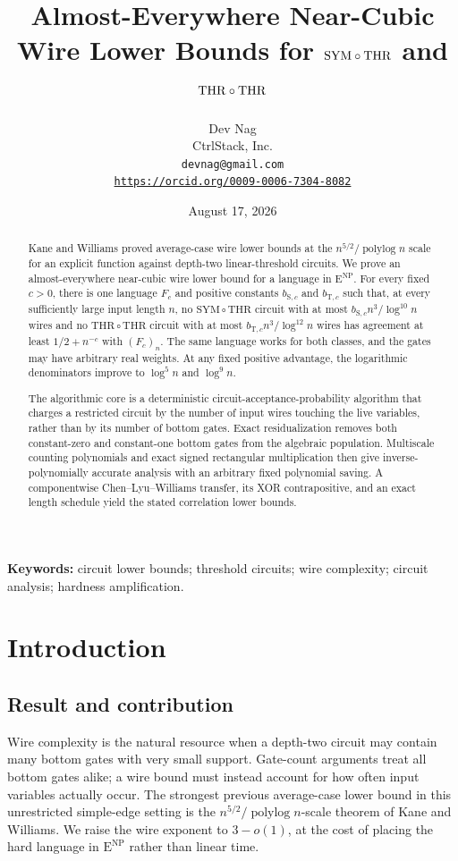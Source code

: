\documentclass[11pt,letterpaper]{article}
\title{Almost-Everywhere Near-Cubic Wire Lower Bounds for
\(\SYMTHR\) and \(\THRTHR\)}
\author{Dev Nag\\
CtrlStack, Inc.\\
\texttt{devnag@gmail.com}\\
\href{https://orcid.org/0009-0006-7304-8082}{\nolinkurl{https://orcid.org/0009-0006-7304-8082}}}
\date{August 17, 2026}
\theoremstyle{definition}
\theoremstyle{remark}
\newcommand{\polylog}{\operatorname{polylog}}
\newcommand{\Eclass}{\mathrm E^{\mathrm{NP}}}
\newcommand{\SYMTHR}{\mathrm{SYM}\circ\mathrm{THR}}
\newcommand{\THRTHR}{\mathrm{THR}\circ\mathrm{THR}}
\begin{document}
\maketitle
\begin{abstract}
Kane and Williams proved average-case wire lower bounds at the
\(n^{5/2}/\polylog n\) scale for an explicit function against depth-two
linear-threshold circuits. We prove an almost-everywhere near-cubic wire
lower bound for a language in \(\Eclass\). For every fixed \(c>0\), there is
one language \(F_c\) and positive constants \(b_{\mathrm S,c}\) and
\(b_{\mathrm T,c}\) such that, at every sufficiently large input length
\(n\), no \(\SYMTHR\) circuit with at most
\(b_{\mathrm S,c}n^3/\log^{10}n\) wires and no \(\THRTHR\) circuit with at
most \(b_{\mathrm T,c}n^3/\log^{12}n\) wires has agreement at least
\(1/2+n^{-c}\) with \((F_c)_n\). The same language works for both
classes, and the gates may have arbitrary real weights. At any fixed positive
advantage, the logarithmic denominators improve to \(\log^5n\) and
\(\log^9n\).

The algorithmic core is a deterministic circuit-acceptance-probability
algorithm that charges a restricted circuit by the number of input wires
touching the live variables, rather than by its number of bottom gates. Exact
residualization removes both constant-zero and constant-one bottom gates from
the algebraic population. Multiscale counting polynomials and exact signed
rectangular multiplication then give inverse-polynomially accurate analysis
with an arbitrary fixed polynomial saving. A componentwise
Chen--Lyu--Williams transfer, its XOR contrapositive, and an exact length
schedule yield the stated correlation lower bounds.
\end{abstract}

\medskip
\noindent\textbf{Keywords:} circuit lower bounds; threshold circuits; wire
complexity; circuit analysis; hardness amplification.

\tableofcontents

\section{Introduction}\label{sec:introduction}

\subsection{Result and contribution}\label{sec:result-contribution}

Wire complexity is the natural resource when a depth-two circuit may contain
many bottom gates with very small support. Gate-count arguments treat all
bottom gates alike; a wire bound must instead account for how often input
variables actually occur. The strongest previous average-case lower bound in
this unrestricted simple-edge setting is the
\(n^{5/2}/\polylog n\)-scale theorem of Kane and Williams. We raise the wire
exponent to \(3-o(1)\), at the cost of placing the hard language in
\(\Eclass\) rather than linear time.
\end{document}
